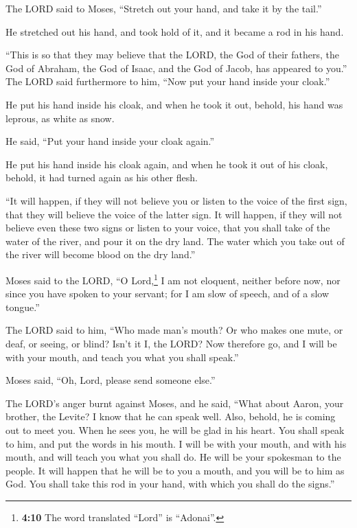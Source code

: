  The LORD said to Moses, ``Stretch out your hand, and take
it by the tail.''

He stretched out his hand, and took hold of it, and it became a rod in
his hand.

 ``This is so that they may believe that the LORD, the God
of their fathers, the God of Abraham, the God of Isaac, and the God of
Jacob, has appeared to you.''  The LORD said furthermore
to him, ``Now put your hand inside your cloak.''

He put his hand inside his cloak, and when he took it out, behold, his
hand was leprous, as white as snow.

 He said, ``Put your hand inside your cloak again.''

He put his hand inside his cloak again, and when he took it out of his
cloak, behold, it had turned again as his other flesh.

 ``It will happen, if they will not believe you or listen
to the voice of the first sign, that they will believe the voice of the
latter sign.  It will happen, if they will not believe
even these two signs or listen to your voice, that you shall take of the
water of the river, and pour it on the dry land. The water which you
take out of the river will become blood on the dry land.''

 Moses said to the LORD, ``O Lord,\footnote{\textbf{4:10}
  The word translated ``Lord'' is ``Adonai''.} I am not eloquent,
neither before now, nor since you have spoken to your servant; for I am
slow of speech, and of a slow tongue.''

 The LORD said to him, ``Who made man's mouth? Or who
makes one mute, or deaf, or seeing, or blind? Isn't it I, the LORD?
 Now therefore go, and I will be with your mouth, and
teach you what you shall speak.''

 Moses said, ``Oh, Lord, please send someone else.''

 The LORD's anger burnt against Moses, and he said,
``What about Aaron, your brother, the Levite? I know that he can speak
well. Also, behold, he is coming out to meet you. When he sees you, he
will be glad in his heart.  You shall speak to him, and
put the words in his mouth. I will be with your mouth, and with his
mouth, and will teach you what you shall do.  He will be
your spokesman to the people. It will happen that he will be to you a
mouth, and you will be to him as God.  You shall take
this rod in your hand, with which you shall do the signs.''

